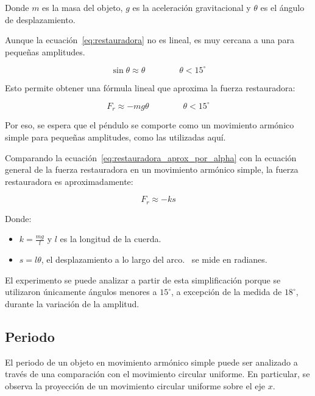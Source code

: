 \documentclass[letterpaper]{report}
\numberwithin{table}{section}
\begin{document}
Donde $m$ es la masa del objeto, $g$ es la aceleración gravitacional y $\theta$
es el ángulo de desplazamiento.

Aunque la ecuación~\eqref{eq:restauradora} no es lineal, es muy cercana
a una para pequeñas amplitudes.

\begin{equation*}
  \sin{\theta} \approx \theta \qquad\qquad \theta < 15^{\circ}
\end{equation*}

Esto permite obtener una fórmula lineal que aproxima la fuerza restauradora:

\begin{equation}\label{eq:restauradora_aprox_por_alpha}
  F_{r} \approx -mg\theta \qquad\qquad \theta < 15^{\circ}
\end{equation}

Por eso, se espera que el péndulo se comporte como un movimiento
armónico simple para pequeñas amplitudes, como las utilizadas aquí.

Comparando la ecuación~\eqref{eq:restauradora_aprox_por_alpha} con la
ecuación general de la fuerza restauradora en un movimiento armónico
simple, la fuerza restauradora es aproximadamente:

\begin{equation}\label{eq:restauradora_mas}
  F_{r} \approx -ks
\end{equation}

Donde:

\begin{itemize}
  \item $k = \frac{mg}{l}$ y $l$ es la longitud de la cuerda.
  \item $s = l\theta$, el desplazamiento a lo largo del
    arco.\ \theta{} se mide en radianes.
\end{itemize}

El experimento se puede analizar a partir de esta simplificación
porque se utilizaron únicamente ángulos menores a $15^{\circ}$, a
excepción de la medida de $18^{\circ}$, durante la variación de la amplitud.

\subsection{Periodo}

El periodo de un objeto en movimiento armónico simple puede ser
analizado a través de una comparación con el movimiento circular
uniforme. En particular, se observa la proyección de un movimiento
circular uniforme sobre el eje $x$.
\end{document}

